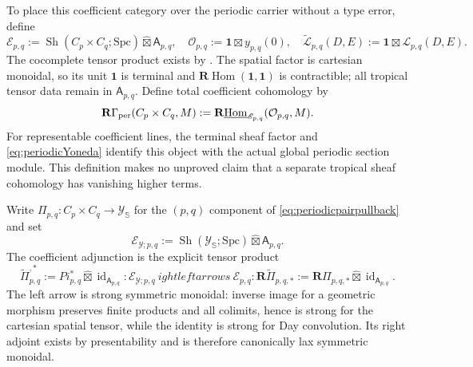 \documentclass[11pt]{amsart}
\theoremstyle{definition}
\theoremstyle{remark}
\begin{document}
To place this coefficient category over the periodic carrier without a
type error, define
\begin{equation}\label{eq:periodicCoefficientTopos}
 \mathscr E_{p,q}:=\operatorname{Sh}(C_p\times C_q;\mathrm{Spc})
 \widehat\boxtimes\mathsf A_{p,q},\quad
 \mathcal O_{p,q}:=\mathbf1\boxtimes y_{p,q}(0),\quad
 \widetilde{\mathcal L}_{p,q}(D,E):=
 \mathbf1\boxtimes\mathcal L_{p,q}(D,E).
\end{equation}
The cocomplete tensor product exists by
\cite[Proposition~4.8.1.17]{LurieHA}.  The spatial factor is cartesian
monoidal, so its unit $\mathbf1$ is terminal and
$\mathbf R\!\operatorname{Hom}(\mathbf1,\mathbf1)$ is contractible; all
tropical tensor data remain in $\mathsf A_{p,q}$.  Define total coefficient
cohomology by
\begin{equation}\label{eq:periodicTotalCohomologyDefinition}
 \mathbf R\Gamma_{\rm per}(C_p\times C_q,M):=
 \mathbf R\underline{\operatorname{Hom}}_{\mathscr E_{p,q}}
 (\mathcal O_{p,q},M).
\end{equation}
For representable coefficient lines, the terminal sheaf factor and
\eqref{eq:periodicYoneda} identify this object with the actual global
periodic section module.  This definition makes no unproved
claim that a separate tropical sheaf cohomology has vanishing higher terms.

Write $\Pi_{p,q}:C_p\times C_q\to\mathscr Y_{\mathbb S}$ for the
$(p,q)$ component of \eqref{eq:periodicpairpullback} and set
\[
 \mathscr E_{\mathscr Y;p,q}:=
 \operatorname{Sh}(\mathscr Y_{\mathbb S};\mathrm{Spc})
 \widehat\boxtimes\mathsf A_{p,q}.
\]
The coefficient adjunction is the explicit tensor product
\begin{equation}\label{eq:periodicComponentAdjunction}
 \widetilde\Pi_{p,q}^{,*}:=Pi_{p,q}^*\widehat\boxtimes
 \operatorname{id}_{\mathsf A_{p,q}} :
 \mathscr E_{\mathscr Y;p,q}
 \
ightleftarrows\
 \mathscr E_{p,q} :
 \mathbf R\widetilde\Pi_{p,q,*}:=
 \mathbf R\Pi_{p,q,*}\widehat\boxtimes
 \operatorname{id}_{\mathsf A_{p,q}}.
\end{equation}
The left arrow is strong symmetric monoidal: inverse image for a geometric
morphism preserves finite products and all colimits, hence is strong for the
cartesian spatial tensor, while the identity is strong for Day convolution.
Its right adjoint exists by presentability and is therefore canonically lax
symmetric monoidal.
\end{document}
